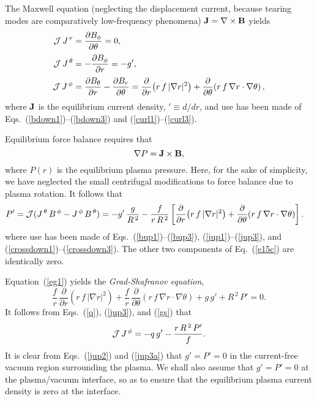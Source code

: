 \documentclass[12pt,prb,aps]{revtex4-1}
\begin{document}
The Maxwell equation (neglecting the displacement current, because tearing modes are comparatively low-frequency phenomena)
${\bf J}= \nabla\times{\bf B}$
yields
\begin{align}
{\cal J}\,J^{\,r} &= \frac{\partial B_\phi}{\partial \theta} =0,\label{jup1}\\[0.5ex]
{\cal J}\,J^{\,\theta} &= -\frac{\partial B_\phi}{\partial r} = - g',\label{jup2}\\[0.5ex]
{\cal J}\,J^{\,\phi}&= \frac{\partial B_\theta}{\partial r} -\frac{\partial B_r}{\partial\theta}=\frac{\partial}{\partial r}\!\left(r\,f\,|\nabla r|^2\right)+ \frac{\partial}{\partial\theta}\!\left(r\,f\,\nabla r\cdot\nabla\theta\right),\label{jup3}
\end{align}
where ${\bf J}$ is the equilibrium current density, $'\equiv d/dr$, and use has been made of  Eqs.~(\ref{bdown1})--(\ref{bdown3}) and (\ref{curl1})--(\ref{curl3}).

Equilibrium force balance requires that
\begin{equation}\label{e15c}
 \nabla P={\bf J}\times {\bf B},
\end{equation}
where $P(r)$ is the equilibrium plasma pressure. Here, for the sake of simplicity, we have neglected the small centrifugal modifications to force balance due to plasma
rotation.\cite{flow,flow1}
It follows that 
\begin{align}\label{eg1}
P'&= {\cal J}(J^{\,\theta}\,B^{\,\phi}-J^{\,\phi}\,B^{\,\theta})= -g'\,\frac{g}{R^{\,2}} - \frac{f}{r\,R^{\,2}}\left[\frac{\partial}{\partial r}\!\left(r\,f\,|\nabla r|^2\right)+ \frac{\partial}{\partial\theta}\!\left(r\,f\,\nabla r\cdot\nabla\theta\right)\right].
\end{align}
where use has been made of Eqs.~(\ref{bup1})--(\ref{bup3}),  (\ref{jup1})--(\ref{jup3}), and (\ref{crossdown1})--(\ref{crossdown3}). The
other two components of Eq.~(\ref{e15c}) are identically zero. 

Equation~(\ref{eg1}) yields the {\em Grad-Shafranov equation},\cite{gs1}
\begin{equation}\label{gs}
\frac{f}{r}\,\frac{\partial}{\partial r}\!\left(r\,f\,|\nabla r|^2\right) +\frac{f}{r}\,\frac{\partial}{\partial\theta}\!\left(r\,f\,\nabla r\cdot\nabla\theta\right)+g\,g' + R^{\,2}\,P'=0.
\end{equation}
It follows from Eqs.~(\ref{q}), (\ref{jup3}), and (\ref{gs}) that
\begin{equation}\label{jup3a}
{\cal J}\,J^{\,\phi} = -q\,g' - \frac{r\,R^{\,2}\,P'}{f}.
\end{equation}
It is clear from Eqs.~(\ref{jup2}) and (\ref{jup3a}) that $g'=P'=0$ in the  current-free vacuum region surrounding the plasma.
We shall also assume that $g'=P'=0$ at the plasma/vacuum interface, so as to ensure that the equilibrium plasma
current density is zero at the interface. 
\end{document}
